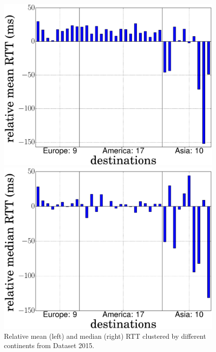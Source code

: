 \begin{figure}[!t]
	\begin{minipage}[c]{.49\linewidth}
		\begin{center}
			\includegraphics[width=.9\linewidth]{Pics/2015/4_probes_to_alexa_top50_diff_rtt_LISP-Lab_FranceIX_mean_geo.eps}
		\end{center}
	\end{minipage}
	\begin{minipage}[c]{.49\linewidth}
		\begin{center}
			\includegraphics[width=.9\linewidth]{Pics/2015/4_probes_to_alexa_top50_diff_rtt_LISP-Lab_FranceIX_median_geo.eps}
		\end{center}
	\end{minipage}
	\vspace{-0.5mm}
	\caption{Relative mean (left) and median (right) RTT clustered by different continents from Dataset 2015.}
	\label{4_probes_to_alexa_top50_diff_rtt_LISP-Lab_FranceIX_geo}
\end{figure}
	
